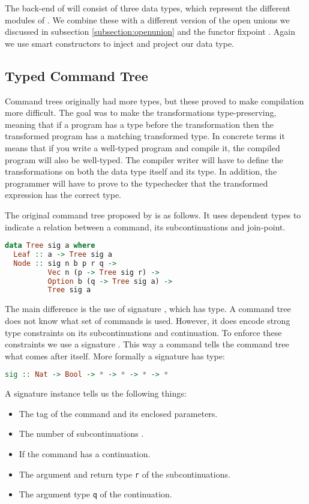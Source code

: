 The back-end of will consist of three data types, which represent the different modules of . We combine these with a different version of the open unions we discussed in subsection \ref{subsection:openunion} and the functor fixpoint . Again we use smart constructors to inject and project our data type.

\subsection{Typed Command Tree}
Command trees originally had more types, but these proved to make compilation more difficult. The goal was to make the transformations type-preserving, meaning that if a program has a type before the transformation then the transformed program has a matching transformed type. In concrete terms it means that if you write a well-typed program and compile it, the compiled program will also be well-typed. The compiler writer will have to define the transformations on both the data type itself and its type. In addition, the programmer will have to prove to the typechecker that the transformed expression has the correct type.

The original command tree proposed by \citeauthor{commandtreespoulsen} is as follows. It uses dependent types to indicate a relation between a command, its subcontinuations and join-point.

\begin{lstlisting}[language=Haskell]
data Tree sig a where
  Leaf :: a -> Tree sig a
  Node :: sig n b p r q ->
          Vec n (p -> Tree sig r) ->
          Option b (q -> Tree sig a) ->
          Tree sig a
\end{lstlisting}

The main difference is the use of signature , which has type. A command tree does not know what set of commands is used. However, it does encode strong type constraints on its subcontinuations and continuation. To enforce these constraints we use a signature . This way a command tells the command tree what comes after itself. More formally a signature has type:

\begin{lstlisting}[language=Haskell]
sig :: Nat -> Bool -> * -> * -> * -> *
\end{lstlisting}

A signature instance  tells us the following things:

\begin{itemize}
\item The tag of the command and its enclosed parameters.
\item The number of subcontinuations .
\item If the command has a continuation.
\item The argument  and return type \lstinline{r} of the subcontinuations.
\item The argument type \lstinline{q} of the continuation.
\end{itemize}

